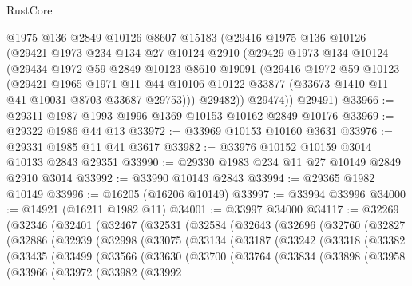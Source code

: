 \begin{lexlean}{RustCore}
\begin{coremodule}
      @1975
      @136
      @2849
      @10126
      @8607
      @15183
      (@29416
        @1975
        @136
        @10126
        (@29421
          @1973
          @234
          @134
          @27
          @10124
          @2910
          (@29429
            @1973
            @134
            @10124
            (@29434
              @1972
              @59
              @2849
              @10123
              @8610
              @19091
              (@29416
                @1972
                @59
                @10123
                (@29421
                  @1965
                  @1971
                  @11
                  @44
                  @10106
                  @10122
                  @33877
                  (@33673 @1410 @11 @41 @10031 @8703 @33687 @29753)))
              @29482))
          @29474))
      @29491)
@33966 := @29311 @1987 @1993 @1996 @1369 @10153 @10162 @2849 @10176
@33969 := @29322 @1986 @44 @13
@33972 := @33969 @10153 @10160 @3631
@33976 := @29331 @1985 @11 @41 @3617
@33982 := @33976 @10152 @10159 @3014 @10133 @2843 @29351
@33990 := @29330 @1983 @234 @11 @27 @10149 @2849 @2910 @3014
@33992 := @33990 @10143 @2843
@33994 := @29365 @1982 @10149
@33996 := @16205 (@16206 @10149)
@33997 := @33994 @33996
@34000 := @14921 (@16211 @1982 @11)
@34001 := @33997 @34000
@34117 := @32269
    (@32346
      (@32401
        (@32467
          (@32531
            (@32584
              (@32643
                (@32696
                  (@32760
                    (@32827
                      (@32886
                        (@32939
                          (@32998
                            (@33075
                              (@33134
                                (@33187
                                  (@33242
                                    (@33318
                                      (@33382
                                        (@33435
                                          (@33499
                                            (@33566
                                              (@33630
                                                (@33700
                                                  (@33764
                                                    (@33834
                                                      (@33898
                                                        (@33958
                                                          (@33966
                                                            (@33972
                                                              (@33982
                                                                (@33992

\end{coremodule}
\end{lexlean}
